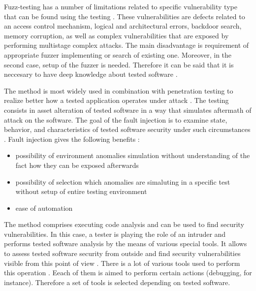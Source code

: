 %
Fuzz-testing has a number of limitations related to specific vulnerability type that can be found using the testing . 
%
These vulnerabilities are defects related to an access control mechanism, logical and architectural errors, backdoor search, memory corruption, as well as complex vulnerabilities that are exposed by performing multistage complex attacks. 
%
The main disadvantage is requirement of appropriate fuzzer implementing or search of existing one. 
%
Moreover, in the second case, setup of the fuzzer is needed. 
%
Therefore it can be said that it is neccesary to have deep knowledge about tested software . 



%
The method is most widely used in combination with penetration testing to realize better how a tested application operates under attack . 
%
The testing consists in asset alteration of tested software in a way that simulates aftermath of attack on the software. 
%
The goal of the fault injection is to examine state, behavior, and characteristics of tested software security under such circumstances . 
%
Fault injection gives the following benefits :
\begin{itemize}
	\leftskip2em%
	\setlength{\itemsep}{0pt}%
	\setlength{\parsep}{0pt}%

	\item possibility of environment anomalies simulation without understanding of the fact how they can be exposed afterwards
	\item possibility of selection which anomalies are simaluting in a specific test without setup of entire testing environment
	\item ease of automation
\end{itemize}



%
The method comprises executing code analysis and can be used to find security vulnerabilities. 
%
In this case, a tester is playing the role of an intruder and performs tested software analysis by the means of various special tools. 
%
It allows to assess tested software security from outside and find security vulnerabilities visible from this point of view . 
%
There is a lot of various tools used to perform this operation . 
%
Eeach of them is aimed to perform certain actions (debugging, for instance). 
%
Therefore a set of tools is selected depending on tested software. 

